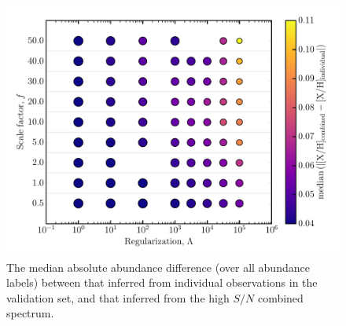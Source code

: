 \documentclass[12pt,preprint]{aastex}
\newcommand{\project}[1]{\textsl{#1}}
\newcommand{\TheCannon}{\project{The~Cannon}}
\newcommand{\acronym}[1]{{\small{#1}}}
\newcommand{\aspcap}{\project{\acronym{ASPCAP}}}
\begin{document}
\begin{figure}[p]
\includegraphics[width=\textwidth]{gs-mad-all-elements.pdf}
\caption{The median absolute abundance difference (over all abundance labels)
between that inferred from individual observations in the validation set, and
that inferred from the high $S/N$ combined spectrum.
\label{fig:gridsearch-mad-all-elements}}
\end{figure}






\clearpage
\end{document}
